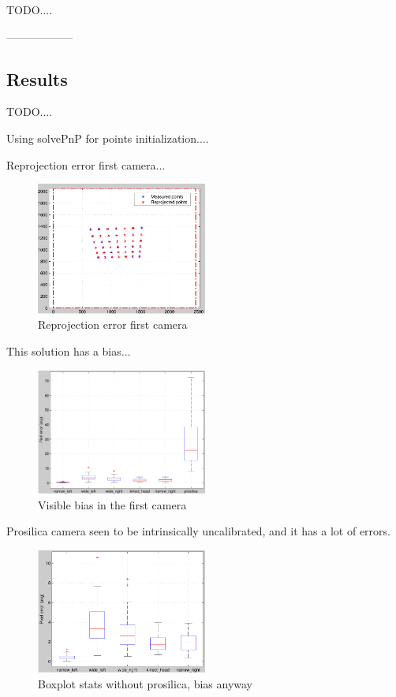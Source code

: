 TODO....



------------------


\subsection{Results}

TODO....

Using solvePnP for points initialization....

Reprojection error first camera...
\begin{figure}[!htbp]
 \centering
 \includegraphics[width=0.5\textwidth]{images/reprojection.pdf}
 \caption{Reprojection error first camera}
 \label{fig:reprojection}
\end{figure}


This solution has a bias...
\begin{figure}[!htbp]
 \centering
 \includegraphics[width=0.5\textwidth]{images/boxplot_stats.pdf}
 \caption{Visible bias in the first camera}
 \label{fig:boxplot_stats}
\end{figure}

Prosilica camera seen to be intrinsically uncalibrated, and it has a lot of errors.
\begin{figure}[!htbp]
 \centering
 \includegraphics[width=0.5\textwidth]{images/boxplot_stats_without_prosilica.pdf}
 \caption{Boxplot stats without prosilica, bias anyway}
 \label{fig:boxplot_stats_without_prosilica}
\end{figure}


